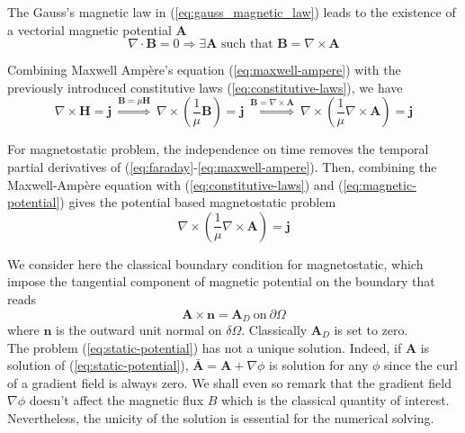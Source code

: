 \documentclass{article}
\newcommand{\bH}{\mathbf{H}}
\newcommand{\bB}{\mathbf{B}}
\newcommand{\bj}{\mathbf{j}}
\newcommand{\bA}{\mathbf{A}}
\begin{document}
The Gauss's magnetic law in (\ref{eq:gauss_magnetic_law}) leads to the existence
of a vectorial magnetic potential $\bA$
\begin{equation}
  \label{eq:magnetic-potential}
  \nabla\cdot\bB=0 \Rightarrow\exists\bA\text{ such that }\bB = \nabla\times\bA
\end{equation}

Combining Maxwell Ampère's equation (\ref{eq:maxwell-ampere}) with the
previously introduced constitutive laws (\ref{eq:constitutive-laws}), we have
\begin{equation}
  \nabla \times \bH = \bj
    ~\overset{ {\scriptstyle \bB = \mu \bH} }{ \Longrightarrow }
    ~\nabla \times \left( \frac{1}{\mu} \bB \right) = \bj
    ~\overset{ {\scriptstyle\bB = \nabla \times \bA} }{ \Longrightarrow }
    ~\nabla \times \left( \frac{1}{\mu} \nabla \times \bA \right) = \bj
\end{equation}

For magnetostatic problem, the independence on time removes the temporal partial
derivatives of (\ref{eq:faraday}-\ref{eq:maxwell-ampere}). Then, combining the
Maxwell-Ampère equation with (\ref{eq:constitutive-laws}) and
(\ref{eq:magnetic-potential}) gives the potential based magnetostatic problem
\begin{equation}
  \label{eq:static-potential}
  \nabla \times \left( \frac{1}{\mu} \nabla \times \bA \right) = \bj
\end{equation}

We consider here the classical boundary condition for magnetostatic, which
impose the tangential component of magnetic potential on the boundary that reads
\begin{equation}
  \label{eq:boundary-cond}
  \bA \times \mathbf{n} = \bA_D ~\text{on} ~\partial \Omega
\end{equation}
where $\mathbf{n}$ is the outward unit normal on $\delta \Omega$.
Classically $\bA_D$ is set to zero. \\

The problem (\ref{eq:static-potential}) has not a unique solution. Indeed, if
$\bA$ is solution of (\ref{eq:static-potential}),
$\bar{\bA} = \bA + \nabla \phi$ is solution for any $\phi$ since the curl of a
gradient field is always zero. We shall even so remark that the gradient field
$\nabla \phi$ doesn't affect the magnetic flux $B$ which is the classical
quantity of interest. \\

Nevertheless, the unicity of the solution is essential for the numerical solving.
\end{document}
